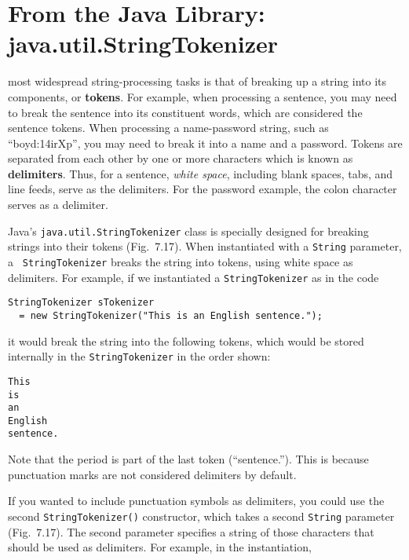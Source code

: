 \section{From the Java Library: \\java.util.StringTokenizer}

 most widespread string-processing tasks is that
of breaking \WWWjava up a string into its components, or {\bf tokens}.
For example, when processing a sentence, you may need to break the
sentence into its constituent words, which are considered the sentence
tokens.  When processing a name-password string, such as
``boyd:14irXp'', you may need to break it into a name and a password.
Tokens are separated from each other by one or more characters which
is known as {\bf delimiters}. Thus, for a sentence, {\em white space},
including blank spaces, tabs, and line feeds, serve as the delimiters.
For the password example, the colon character serves as a delimiter.

Java's {\tt java.util.StringTokenizer} class
is specially designed for breaking strings into their tokens
(Fig.~7.17). When instantiated with a {\tt String} parameter, a {\tt
StringTokenizer} breaks the string into tokens, using white space as
delimiters.  For example, if we instantiated a {\tt StringTokenizer}
as in the code

\begin{jjjlisting}
\begin{lstlisting}
StringTokenizer sTokenizer
  = new StringTokenizer("This is an English sentence.");
\end{lstlisting}
\end{jjjlisting}

\noindent it would break the string into the following
tokens, which would be stored internally in the {\tt StringTokenizer}
in the  order shown:

\begin{jjjlisting}
\begin{lstlisting}
This
is
an
English
sentence.
\end{lstlisting}
\end{jjjlisting}

\noindent Note that the period is part of the last token
(``sentence.''). This is because punctuation marks are not
considered delimiters by default.  

If you wanted to include punctuation symbols as delimiters, you could
use the second {\tt StringTokenizer()} constructor, which takes a
second {\tt String} parameter (Fig.~7.17).  The second
parameter specifies a string of those characters that should be used
as delimiters.  For example, in the  instantiation,

